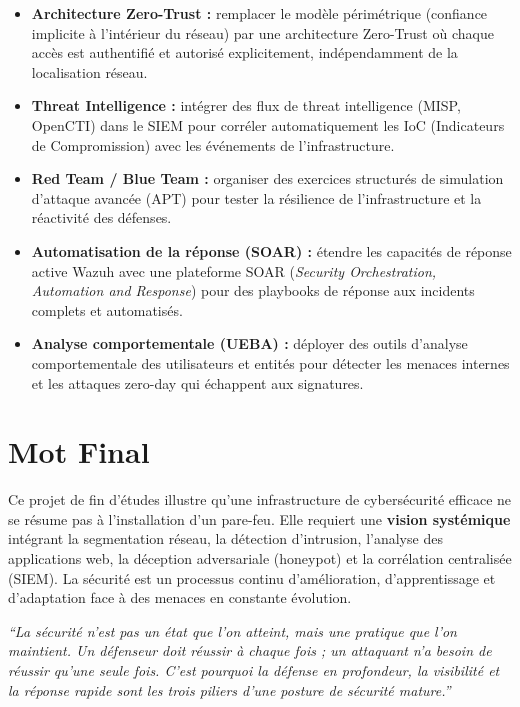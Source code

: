 \documentclass[12pt,a4paper,openany]{report}
\begin{document}
\begin{itemize}
    \item \textbf{Architecture Zero-Trust :} remplacer le modèle périmétrique (confiance implicite
          à l'intérieur du réseau) par une architecture Zero-Trust où chaque accès est authentifié
          et autorisé explicitement, indépendamment de la localisation réseau.

    \item \textbf{Threat Intelligence :} intégrer des flux de threat intelligence (MISP, OpenCTI)
          dans le SIEM pour corréler automatiquement les IoC (Indicateurs de Compromission) avec
          les événements de l'infrastructure.

    \item \textbf{Red Team / Blue Team :} organiser des exercices structurés de simulation d'attaque
          avancée (APT) pour tester la résilience de l'infrastructure et la réactivité des défenses.

    \item \textbf{Automatisation de la réponse (SOAR) :} étendre les capacités de réponse active
          Wazuh avec une plateforme SOAR (\textit{Security Orchestration, Automation and Response})
          pour des playbooks de réponse aux incidents complets et automatisés.

    \item \textbf{Analyse comportementale (UEBA) :} déployer des outils d'analyse comportementale
          des utilisateurs et entités pour détecter les menaces internes et les attaques zero-day
          qui échappent aux signatures.
\end{itemize}

\section*{Mot Final}

Ce projet de fin d'études illustre qu'une infrastructure de cybersécurité efficace ne se résume pas
à l'installation d'un pare-feu. Elle requiert une \textbf{vision systémique} intégrant la
segmentation réseau, la détection d'intrusion, l'analyse des applications web, la déception
adversariale (honeypot) et la corrélation centralisée (SIEM). La sécurité est un processus
continu d'amélioration, d'apprentissage et d'adaptation face à des menaces en constante évolution.

\begin{tcolorbox}[colback=primary!8!white, colframe=primary, title=\textbf{Philosophie de la Cyberdéfense}]
\textit{``La sécurité n'est pas un état que l'on atteint, mais une pratique que l'on maintient.
Un défenseur doit réussir à chaque fois ; un attaquant n'a besoin de réussir qu'une seule fois.
C'est pourquoi la défense en profondeur, la visibilité et la réponse rapide sont les trois piliers
d'une posture de sécurité mature.''}
\end{tcolorbox}
\end{document}
